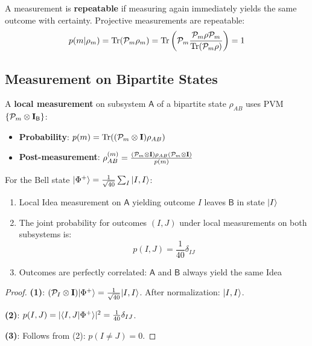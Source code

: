 \begin{definition}[Repeatability]
\label{def:repeatability}
A measurement is \textbf{repeatable} if measuring again immediately yields the same outcome with certainty. Projective measurements are repeatable:
\[
p(m|\rho_m) = \mathrm{Tr}(\mathcal{P}_m \rho_m) = \mathrm{Tr}\left(\mathcal{P}_m \frac{\mathcal{P}_m \rho \mathcal{P}_m}{\mathrm{Tr}(\mathcal{P}_m \rho)}\right) = 1
\]
\end{definition}

\subsection{Measurement on Bipartite States}

\begin{definition}
\label{def:local-measurement}
A \textbf{local measurement} on subsystem $\mathsf{A}$ of a bipartite state $\rho_{AB}$ uses PVM $\{\mathcal{P}_m \otimes \mathbf{I}_\mathsf{B}\}$:
\begin{itemize}
  \item \textbf{Probability}: $p(m) = \mathrm{Tr}((\mathcal{P}_m \otimes \mathbf{I}) \rho_{AB})$
  \item \textbf{Post-measurement}: $\rho_{AB}^{(m)} = \frac{(\mathcal{P}_m \otimes \mathbf{I}) \rho_{AB} (\mathcal{P}_m \otimes \mathbf{I})}{p(m)}$
\end{itemize}
\end{definition}

\begin{theorem}
\label{thm:entanglement-correlations}
For the Bell state $|\Phi^+\rangle = \frac{1}{\sqrt{40}}\sum_I |I, I\rangle$:
\begin{enumerate}
  \item Local Idea measurement on $\mathsf{A}$ yielding outcome $I$ leaves $\mathsf{B}$ in state $|I\rangle$
  \item The joint probability for outcomes $(I, J)$ under local measurements on both subsystems is:
  \[
  p(I, J) = \frac{1}{40} \delta_{IJ}
  \]
  \item Outcomes are perfectly correlated: $\mathsf{A}$ and $\mathsf{B}$ always yield the same Idea
\end{enumerate}
\end{theorem}

\begin{proof}
\textbf{(1)}: $(\mathcal{P}_I \otimes \mathbf{I})|\Phi^+\rangle = \frac{1}{\sqrt{40}}|I, I\rangle$. After normalization: $|I, I\rangle$.

\textbf{(2)}: $p(I, J) = |\langle I, J|\Phi^+\rangle|^2 = \frac{1}{40}\delta_{IJ}$.

\textbf{(3)}: Follows from (2): $p(I \neq J) = 0$.
\end{proof}

